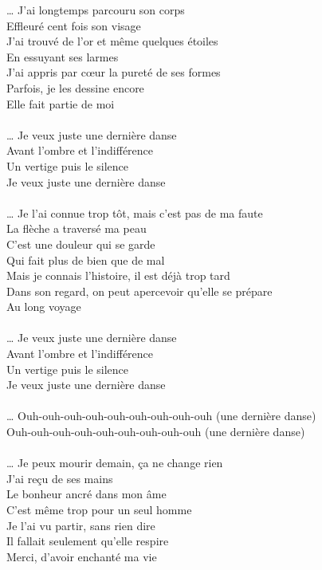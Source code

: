 … J'ai longtemps parcouru son corps\\
Effleuré cent fois son visage\\
J'ai trouvé de l'or et même quelques étoiles\\
En essuyant ses larmes\\
J'ai appris par cœur la pureté de ses formes\\
Parfois, je les dessine encore\\
Elle fait partie de moi\\\\
… Je veux juste une dernière danse\\
Avant l'ombre et l'indifférence\\
Un vertige puis le silence\\
Je veux juste une dernière danse\\\\
… Je l'ai connue trop tôt, mais c'est pas de ma faute\\
La flèche a traversé ma peau\\
C'est une douleur qui se garde\\
Qui fait plus de bien que de mal\\
Mais je connais l'histoire, il est déjà trop tard\\
Dans son regard, on peut apercevoir qu'elle se prépare\\
Au long voyage\\\\
… Je veux juste une dernière danse\\
Avant l'ombre et l'indifférence\\
Un vertige puis le silence\\
Je veux juste une dernière danse\\\\
… Ouh-ouh-ouh-ouh-ouh-ouh-ouh-ouh-ouh (une dernière danse)\\
Ouh-ouh-ouh-ouh-ouh-ouh-ouh-ouh-ouh (une dernière danse)\\\\
… Je peux mourir demain, ça ne change rien\\
J'ai reçu de ses mains\\
Le bonheur ancré dans mon âme\\
C'est même trop pour un seul homme\\
Je l'ai vu partir, sans rien dire\\
Il fallait seulement qu'elle respire\\
Merci, d'avoir enchanté ma vie\\\\
